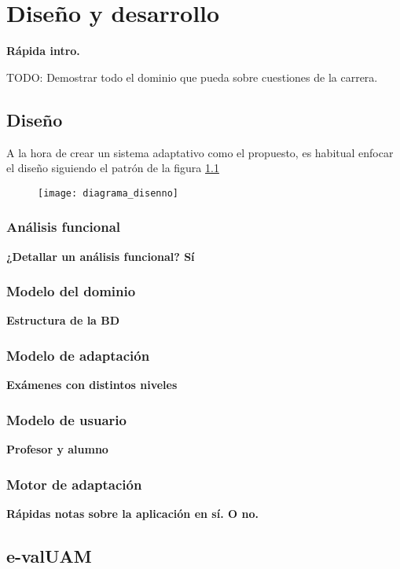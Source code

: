 \chapter{Diseño y desarrollo\label{sec:disenhoYDesarrollo}}

\textbf{Rápida intro.}

TODO: Demostrar todo el dominio que pueda sobre cuestiones de la carrera.

\section{Diseño}

A la hora de crear un sistema adaptativo como el propuesto, es habitual enfocar el diseño siguiendo el patrón de la figura \ref{fig:diagrama_disenno}

\begin{figure}[htp!]
	\centering
	\texttt{[image: diagrama\_disenno]}
	\caption{}
	\label{fig:diagrama_disenno}
\end{figure} 

\subsection{Análisis funcional}

\textbf{¿Detallar un análisis funcional? Sí}

\subsection{Modelo del dominio}

\textbf{Estructura de la BD}

\subsection{Modelo de adaptación}

\textbf{Exámenes con distintos niveles}

\subsection{Modelo de usuario}

\textbf{Profesor y alumno}

\subsection{Motor de adaptación}

\textbf{Rápidas notas sobre la aplicación en sí. O no.}

\section{e-valUAM}
